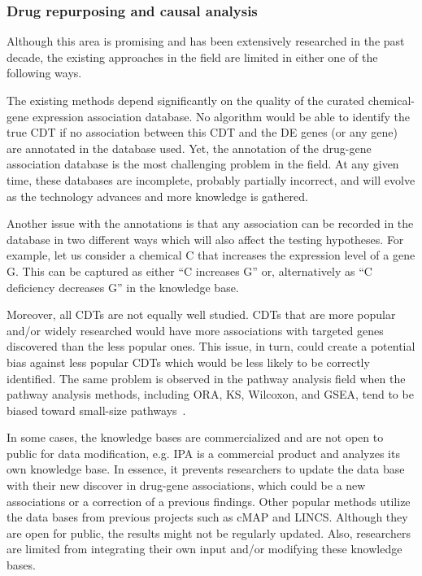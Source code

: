 \subsubsection{Drug repurposing and causal analysis}

Although this area is promising and has been extensively researched in the past decade, the existing approaches in the field are limited in either one of the following ways.

The existing methods depend significantly on the quality of the curated chemical-gene expression association database. 
No algorithm would be able to identify the true CDT if no association between this CDT and the DE genes (or any gene) are annotated in the database used.
Yet, the annotation of the drug-gene association database is the most challenging problem in the field. 
At any given time, these databases are incomplete, probably partially incorrect, and will evolve as the technology advances and more knowledge is gathered. 

Another issue with the annotations is that any association can be recorded in the database in two different ways which will also affect the testing hypotheses.
For example, let us consider a chemical C that increases  the   expression level of a gene G. This can be captured as either ``C increases G'' or, alternatively as ``C deficiency decreases G'' in the knowledge base. 

Moreover, all CDTs are not equally well studied. CDTs that are more popular and/or widely researched would have more associations with targeted genes discovered than the less popular ones.
This issue, in turn, could create a potential bias against less popular CDTs which would be less likely to be correctly identified.
The same problem is observed in the pathway analysis field when the pathway analysis methods, including ORA, KS, Wilcoxon, and GSEA, tend to be biased toward small-size pathways~\cite{nguyen2019identifying}.

In some cases, the knowledge bases are commercialized and are not open to public for data modification, e.g. IPA is a commercial product and analyzes its own knowledge base. In essence, it prevents researchers to update the data base with their new discover in drug-gene associations, which could be a new associations or a correction of a previous findings. 
Other popular methods utilize the data bases from previous projects such as cMAP and LINCS. Although they are open for public, the results might not be regularly updated. Also, researchers are limited from integrating their own input and/or modifying these knowledge bases. 

